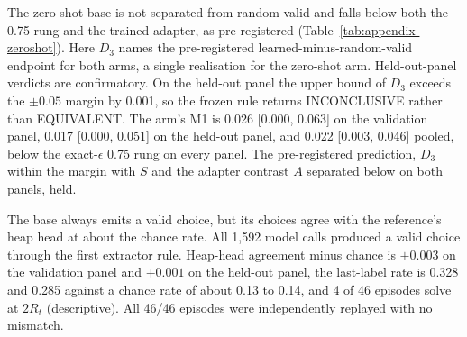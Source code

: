 The zero-shot base is not separated from random-valid and falls below both the 0.75 rung and the trained adapter, as pre-registered (Table~\ref{tab:appendix-zeroshot}). Here $D_3$ names the pre-registered learned-minus-random-valid endpoint for both arms, a single realisation for the zero-shot arm. Held-out-panel verdicts are confirmatory. On the held-out panel the upper bound of $D_3$ exceeds the $\pm 0.05$ margin by 0.001, so the frozen rule returns INCONCLUSIVE rather than EQUIVALENT. The arm's M1 is 0.026 [0.000, 0.063] on the validation panel, 0.017 [0.000, 0.051] on the held-out panel, and 0.022 [0.003, 0.046] pooled, below the exact-$\epsilon$ 0.75 rung on every panel. The pre-registered prediction, $D_3$ within the margin with $S$ and the adapter contrast $A$ separated below on both panels, held.

The base always emits a valid choice, but its choices agree with the reference's heap head at about the chance rate. All 1,592 model calls produced a valid choice through the first extractor rule. Heap-head agreement minus chance is $+0.003$ on the validation panel and $+0.001$ on the held-out panel, the last-label rate is 0.328 and 0.285 against a chance rate of about 0.13 to 0.14, and 4 of 46 episodes solve at $2R_t$ (descriptive). All 46/46 episodes were independently replayed with no mismatch.

